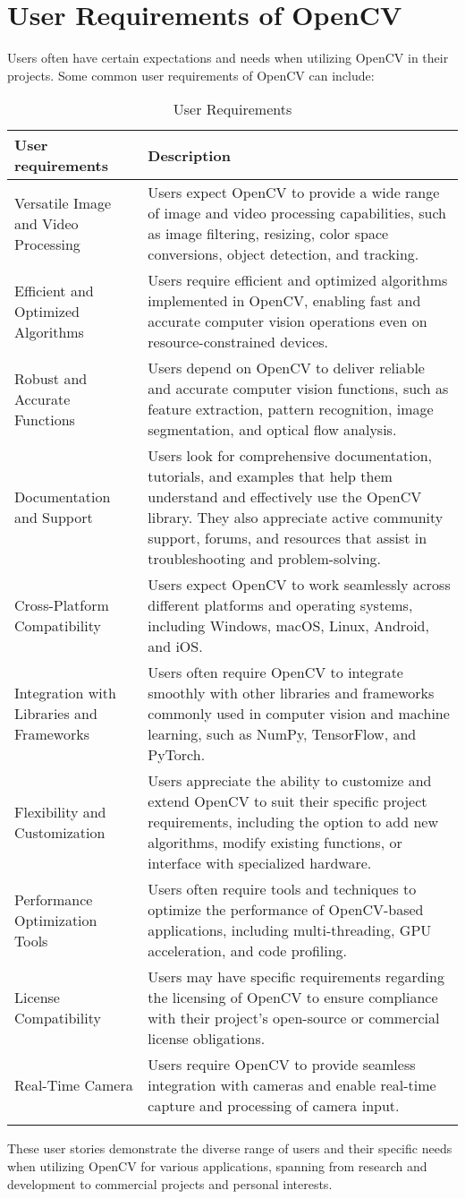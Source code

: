 \section{User Requirements of OpenCV \label{Section::UserRequirements}}
Users often have certain expectations and needs when utilizing OpenCV in their projects. Some common user requirements of OpenCV can include:
\begin{longtable}{| p{} | p{} |} 
\hline
\textbf{User requirements} & \textbf{Description}  \\ \hline
Versatile Image and Video Processing & Users expect OpenCV to provide a wide range of image and video processing capabilities, such as image filtering, resizing, color space conversions, object detection, and tracking. \\ \hline 
Efficient and Optimized Algorithms & Users require efficient and optimized algorithms implemented in OpenCV, enabling fast and accurate computer vision operations even on resource-constrained devices. \\ \hline
Robust and Accurate Functions & Users depend on OpenCV to deliver reliable and accurate computer vision functions, such as feature extraction, pattern recognition, image segmentation, and optical flow analysis. \\ \hline
Documentation and Support & Users look for comprehensive documentation, tutorials, and examples that help them understand and effectively use the OpenCV library. They also appreciate active community support, forums, and resources that assist in troubleshooting and problem-solving. \\ \hline
Cross-Platform Compatibility & Users expect OpenCV to work seamlessly across different platforms and operating systems, including Windows, macOS, Linux, Android, and iOS. \\ \hline
Integration with Libraries and Frameworks & Users often require OpenCV to integrate smoothly with other libraries and frameworks commonly used in computer vision and machine learning, such as NumPy, TensorFlow, and PyTorch. \\ \hline
Flexibility and Customization & Users appreciate the ability to customize and extend OpenCV to suit their specific project requirements, including the option to add new algorithms, modify existing functions, or interface with specialized hardware. \\ \hline
Performance Optimization Tools & Users often require tools and techniques to optimize the performance of OpenCV-based applications, including multi-threading, GPU acceleration, and code profiling. \\ \hline
License Compatibility & Users may have specific requirements regarding the licensing of OpenCV to ensure compliance with their project's open-source or commercial license obligations. \\ \hline
Real-Time Camera & Users require OpenCV to provide seamless integration with cameras and enable real-time capture and processing of camera input. \\ \hline 
\caption{User Requirements \label{Table::UserRequirements}}
\end{longtable}

These user stories demonstrate the diverse range of users and their specific needs when utilizing OpenCV for various applications, spanning from research and development to commercial projects and personal interests.